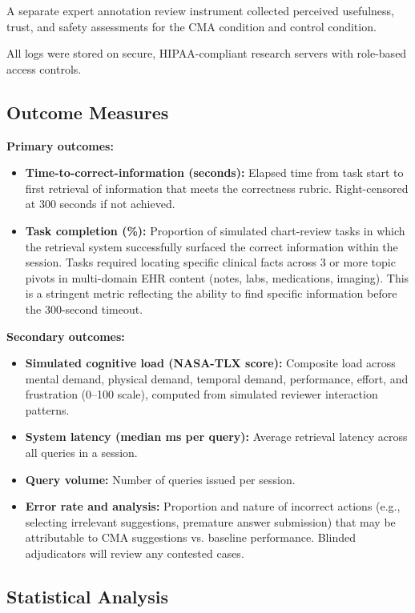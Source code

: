 \documentclass[preprint,12pt]{elsarticle}
\begin{document}
A separate expert annotation review instrument collected perceived usefulness, trust, and safety assessments for the CMA condition and control condition.

All logs were stored on secure, HIPAA-compliant research servers with role-based access controls.

\subsection{Outcome Measures}

\textbf{Primary outcomes:}
\begin{itemize}
  \item \textbf{Time-to-correct-information (seconds):} Elapsed time from task start to first retrieval of information that meets the correctness rubric. Right-censored at 300 seconds if not achieved.
  \item \textbf{Task completion (\%):} Proportion of simulated chart-review tasks in which the retrieval system successfully surfaced the correct information within the session. Tasks required locating specific clinical facts across 3 or more topic pivots in multi-domain EHR content (notes, labs, medications, imaging). This is a stringent metric reflecting the ability to find specific information before the 300-second timeout.
\end{itemize}

\textbf{Secondary outcomes:}
\begin{itemize}
  \item \textbf{Simulated cognitive load (NASA-TLX score):} Composite load across mental demand, physical demand, temporal demand, performance, effort, and frustration (0--100 scale), computed from simulated reviewer interaction patterns.
  \item \textbf{System latency (median ms per query):} Average retrieval latency across all queries in a session.
  \item \textbf{Query volume:} Number of queries issued per session.
  \item \textbf{Error rate and analysis:} Proportion and nature of incorrect actions (e.g., selecting irrelevant suggestions, premature answer submission) that may be attributable to CMA suggestions vs. baseline performance. Blinded adjudicators will review any contested cases.
\end{itemize}

\subsection{Statistical Analysis}
\end{document}

